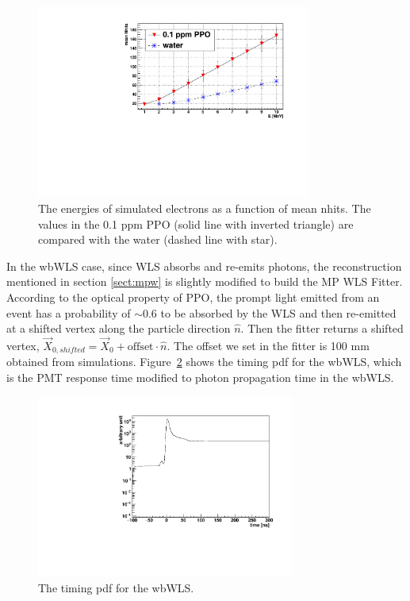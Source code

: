 \begin{figure}[htbp]
	\centering	
	\includegraphics[width=9cm]{nhits_wls.pdf}
	\caption{ The energies of simulated electrons as a function of mean nhits. The values in the 0.1 ppm PPO (solid line with inverted triangle) are compared with the water (dashed line with star).}
	\label{nhit_wls}
\end{figure}

In the wbWLS case, since WLS absorbs and re-emits photons, the reconstruction mentioned in section \ref{sect:mpw} is slightly modified to build the MP WLS Fitter. According to the optical property of PPO, the prompt light emitted from an event has a probability of $\sim$0.6 to be absorbed by the WLS and then re-emitted at a shifted vertex along the particle direction $\hat{n}$. Then the fitter returns a shifted vertex, $\vec{X}_{0,shifted}=\vec{X}_0+\mathrm{offset}\cdot\hat{n}$. The offset we set in the fitter is 100 mm obtained from simulations. Figure~\ref{WLS_pdf} shows the timing pdf for the wbWLS, which is the PMT response time modified to photon propagation time in the wbWLS.
\begin{figure}[htbp]	
	\centering		
	\begin{minipage}[b]{0.5\textwidth}			
		\includegraphics[height=6cm]{WLSTime_pdf.pdf}			
	\end{minipage}%
	\caption{\label{WLS_pdf} The timing pdf for the wbWLS.}	
\end{figure}

